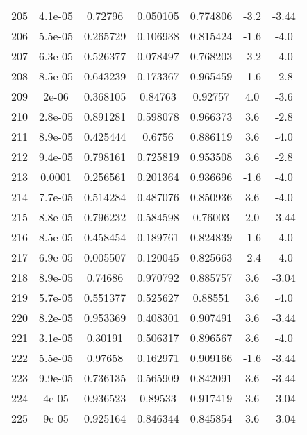 \begin{table}
\begin{tabular}{c|c|c|c|c|c|c}
205 & 4.1e-05 & 0.72796 & 0.050105 & 0.774806 & -3.2 & -3.44\\
206 & 5.5e-05 & 0.265729 & 0.106938 & 0.815424 & -1.6 & -4.0\\
207 & 6.3e-05 & 0.526377 & 0.078497 & 0.768203 & -3.2 & -4.0\\
208 & 8.5e-05 & 0.643239 & 0.173367 & 0.965459 & -1.6 & -2.8\\
209 & 2e-06 & 0.368105 & 0.84763 & 0.92757 & 4.0 & -3.6\\
210 & 2.8e-05 & 0.891281 & 0.598078 & 0.966373 & 3.6 & -2.8\\
211 & 8.9e-05 & 0.425444 & 0.6756 & 0.886119 & 3.6 & -4.0\\
212 & 9.4e-05 & 0.798161 & 0.725819 & 0.953508 & 3.6 & -2.8\\
213 & 0.0001 & 0.256561 & 0.201364 & 0.936696 & -1.6 & -4.0\\
214 & 7.7e-05 & 0.514284 & 0.487076 & 0.850936 & 3.6 & -4.0\\
215 & 8.8e-05 & 0.796232 & 0.584598 & 0.76003 & 2.0 & -3.44\\
216 & 8.5e-05 & 0.458454 & 0.189761 & 0.824839 & -1.6 & -4.0\\
217 & 6.9e-05 & 0.005507 & 0.120045 & 0.825663 & -2.4 & -4.0\\
218 & 8.9e-05 & 0.74686 & 0.970792 & 0.885757 & 3.6 & -3.04\\
219 & 5.7e-05 & 0.551377 & 0.525627 & 0.88551 & 3.6 & -4.0\\
220 & 8.2e-05 & 0.953369 & 0.408301 & 0.907491 & 3.6 & -3.44\\
221 & 3.1e-05 & 0.30191 & 0.506317 & 0.896567 & 3.6 & -4.0\\
222 & 5.5e-05 & 0.97658 & 0.162971 & 0.909166 & -1.6 & -3.44\\
223 & 9.9e-05 & 0.736135 & 0.565909 & 0.842091 & 3.6 & -3.44\\
224 & 4e-05 & 0.936523 & 0.89533 & 0.917419 & 3.6 & -3.04\\
225 & 9e-05 & 0.925164 & 0.846344 & 0.845854 & 3.6 & -3.04\\
\end{tabular}
\end{table}
\newpage
